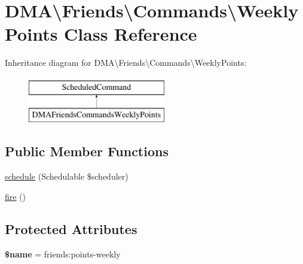 \hypertarget{classDMA_1_1Friends_1_1Commands_1_1WeeklyPoints}{}\section{D\+M\+A\textbackslash{}Friends\textbackslash{}Commands\textbackslash{}Weekly\+Points Class Reference}
\label{classDMA_1_1Friends_1_1Commands_1_1WeeklyPoints}
Inheritance diagram for D\+M\+A\textbackslash{}Friends\textbackslash{}Commands\textbackslash{}Weekly\+Points\+:\begin{figure}[H]
\begin{center}
\leavevmode
\includegraphics[height=2.000000cm]{d5/d03/classDMA_1_1Friends_1_1Commands_1_1WeeklyPoints}
\end{center}
\end{figure}
\subsection*{Public Member Functions}
\begin{DoxyCompactItemize}
\item 
\hyperlink{classDMA_1_1Friends_1_1Commands_1_1WeeklyPoints_a3610e0fd1a7e2e91dd70a05bfb7f94e8}{schedule} (Schedulable \$scheduler)
\item 
\hyperlink{classDMA_1_1Friends_1_1Commands_1_1WeeklyPoints_a3fb80cfeb37ba525e9b24e7362e35daf}{fire} ()
\end{DoxyCompactItemize}
\subsection*{Protected Attributes}
\begin{DoxyCompactItemize}
\item 
\hypertarget{classDMA_1_1Friends_1_1Commands_1_1WeeklyPoints_a246f543fbe9edae766eb00112beacf2c}{}{\bfseries \$name} = \textquotesingle{}friends\+:points-\/weekly\textquotesingle{}\label{classDMA_1_1Friends_1_1Commands_1_1WeeklyPoints_a246f543fbe9edae766eb00112beacf2c}

\end{DoxyCompactItemize}



